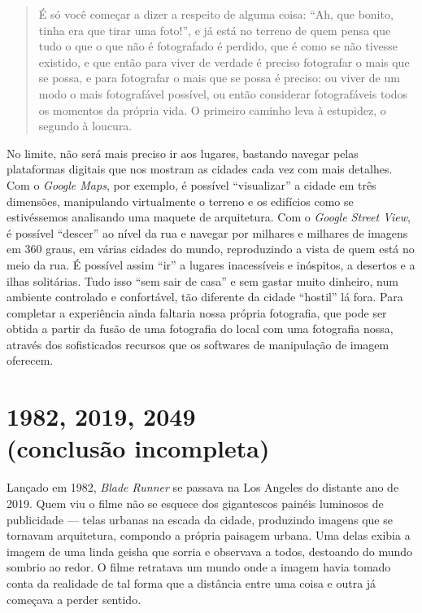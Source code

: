 \begin{quote}
É só você começar a dizer a respeito de alguma coisa: ``Ah, que bonito,
tinha era que tirar uma foto!'', e já está no terreno de quem pensa que
tudo o que o que não é fotografado é perdido, que é como se não tivesse
existido, e que então para viver de verdade é preciso fotografar o mais
que se possa, e para fotografar o mais que se possa é preciso: ou viver
de um modo o mais fotografável possível, ou então considerar
fotografáveis todos os momentos da própria vida. O primeiro caminho leva
à estupidez, o segundo à loucura.
\end{quote}

No limite, não será mais preciso ir aos lugares, bastando navegar pelas
plataformas digitais que nos mostram as cidades cada vez com mais
detalhes. Com o \emph{Google Maps}, por exemplo, é possível
``visualizar'' a cidade em três dimensões, manipulando virtualmente o
terreno e os edifícios como se estivéssemos analisando uma maquete de
arquitetura. Com o \emph{Google Street View}, é possível ``descer'' ao
nível da rua e navegar por milhares e milhares de imagens em 360 graus,
em várias cidades do mundo, reproduzindo a vista de quem está no meio da
rua. É possível assim ``ir'' a lugares inacessíveis e inóspitos, a
desertos e a ilhas solitárias. Tudo isso ``sem sair de casa'' e sem
gastar muito dinheiro, num ambiente controlado e confortável, tão
diferente da cidade ``hostil'' lá fora. Para completar a experiência
ainda faltaria nossa própria fotografia, que pode ser obtida a partir da
fusão de uma fotografia do local com uma fotografia nossa, através dos
sofisticados recursos que os softwares de manipulação de imagem
oferecem.

\chapter*{1982, 2019, 2049\\ (conclusão incompleta)}

Lançado em 1982, \emph{Blade Runner} se passava na Los Angeles do
distante ano de 2019. Quem viu o filme não se esquece dos gigantescos
painéis luminosos de publicidade --- telas urbanas na escada da cidade,
produzindo imagens que se tornavam arquitetura, compondo a própria
paisagem urbana. Uma delas exibia a imagem de uma linda geisha que
sorria e observava a todos, destoando do mundo sombrio ao redor. O filme
retratava um mundo onde a imagem havia tomado conta da realidade de tal
forma que a distância entre uma coisa e outra já começava a perder
sentido.

